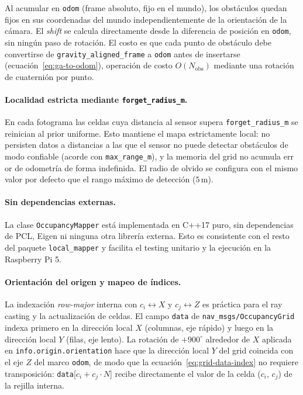 Al acumular en \texttt{odom} (frame absoluto, fijo en el mundo), los
obstáculos quedan fijos en sus coordenadas del mundo independientemente de
la orientación de la cámara. El \emph{shift} se calcula directamente desde
la diferencia de posición en \texttt{odom}, sin ningún paso de rotación.
El costo es que cada punto de obstáculo debe convertirse de
\texttt{gravity\_aligned\_frame} a \texttt{odom} antes de insertarse
(ecuación~\ref{eq:ga-to-odom}), operación de costo $O(N_{\text{obs}})$
mediante una rotación de cuaternión por punto.

\paragraph{Localidad estricta mediante \texttt{forget\_radius\_m}.}
En cada fotograma las celdas cuya distancia al sensor supera
\texttt{forget\_radius\_m} se reinician al prior uniforme. Esto mantiene el
mapa estrictamente local: no persisten datos a distancias a las que el sensor
no puede detectar obstáculos de modo confiable (acorde con
\texttt{max\_range\_m}), y la memoria del grid no acumula err or de odometría
de forma indefinida. El radio de olvido se configura con el mismo valor
por defecto que el rango máximo de detección ($5\,\text{m}$).

\paragraph{Sin dependencias externas.}
La clase \texttt{OccupancyMapper} está implementada en C++17 puro, sin
dependencias de PCL, Eigen ni ninguna otra librería externa. Esto es
consistente con el resto del paquete \texttt{local\_mapper} y facilita el
testing unitario y la ejecución en la Raspberry Pi 5.

\paragraph{Orientación del origen y mapeo de índices.}
La indexación \emph{row-major} interna con $c_i \leftrightarrow X$ y
$c_j \leftrightarrow Z$ es práctica para el ray casting y la actualización
de celdas. El campo \texttt{data} de \texttt{nav\_msgs/OccupancyGrid}
indexa primero en la dirección local $X$ (columnas, eje rápido) y luego
en la dirección local $Y$ (filas, eje lento). La rotación de $+900^{\circ}$
alrededor de $X$ aplicada en \texttt{info.origin.orientation} hace que la
dirección local $Y$ del grid coincida con el eje $Z$ del marco
\texttt{odom}, de modo que la ecuación~\ref{eq:grid-data-index} no
requiere transposición: \texttt{data}[$c_i + c_j \cdot N$] recibe
directamente el valor de la celda ($c_i$, $c_j$) de la rejilla interna.
